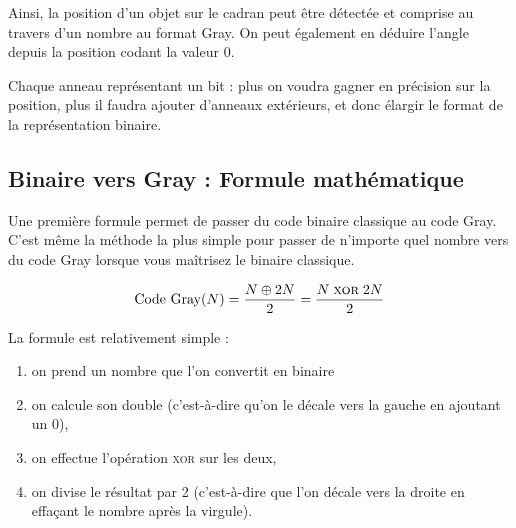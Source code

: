 \documentclass[11pt,a4paper]{article}
\begin{document}
Ainsi, la position d'un objet sur le cadran peut être détectée et comprise au travers d'un nombre au format Gray.
On peut également en déduire l'angle depuis la position codant la valeur 0.

Chaque anneau représentant un bit : plus on voudra gagner en précision sur la position, plus il faudra ajouter d'anneaux extérieurs, et donc élargir le format de la représentation binaire.


\bigskip


\subsection{Binaire vers Gray : Formule mathématique}

Une première formule permet de passer du code binaire classique au code Gray.
C'est même la méthode la plus simple pour passer de n'importe quel nombre vers du code Gray lorsque vous maîtrisez le binaire classique.

\begin{equation*}
\text{Code Gray}(N) = \frac{N \oplus 2N}{2} = \frac{N \; \textsc{xor} \; 2N}{2}
\end{equation*}

\medskip

La formule est relativement simple :
\begin{enumerate}
\item on prend un nombre que l'on convertit en binaire
\item on calcule son double (c'est-à-dire qu'on le décale vers la gauche en ajoutant un 0),
\item on effectue l'opération \textsc{xor} sur les deux,
\item on divise le résultat par 2 (c'est-à-dire que l'on décale vers la droite en effaçant le nombre après la virgule).
\end{enumerate}
\end{document}
